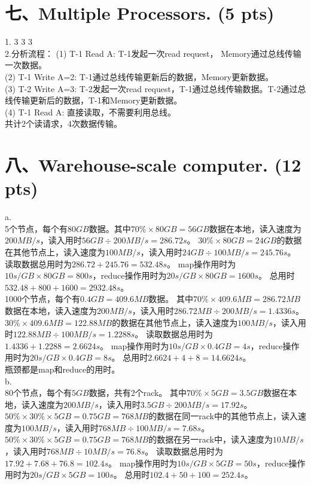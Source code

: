 \documentclass[UTF8]{ctexart}
\begin{document}
\section*{七、Multiple Processors. (5 pts)}
1. 3 3 3\\
2.分析流程：
(1) T-1 Read A: T-1发起一次read request， Memory通过总线传输一次数据。\\
(2) T-1 Write A=2: T-1通过总线传输更新后的数据，Memory更新数据。\\
(3) T-2 Write A=3: T-2发起一次read request，T-1通过总线传输数据。T-2通过总线传输更新后的数据，T-1和Memory更新数据。\\
(4) T-1 Read A: 直接读取，不需要利用总线。\\
共计2个读请求，4次数据传输。\\
\section*{八、Warehouse-scale computer. (12 pts)}
a. \\
5个节点，每个有$80GB$数据。其中$70\%\times80GB=56GB$数据在本地，读入速度为$200MB/s$，读入用时$56GB\div200MB/s=286.72s$。
$30\%\times80GB=24GB$的数据在其他节点上，读入速度为$100MB/s$，读入用时$24GB\div100MB/s=245.76s$。
读取数据总用时为$286.72+245.76=532.48s$。
map操作用时为$10s/GB\times80GB=800s$，reduce操作用时为$20s/GB\times80GB=1600s$。
总用时$532.48+800+1600=2932.48s$。\\

1000个节点，每个有$0.4GB=409.6MB$数据。
其中$70\%\times409.6MB=286.72MB$数据在本地，读入速度为$200MB/s$，读入用时$286.72MB\div200MB/s=1.4336s$。
$30\%\times409.6MB=122.88MB$的数据在其他节点上，读入速度为$100MB/s$，读入用时$122.88MB\div100MB/s=1.2288s$。
读取数据总用时为$1.4336+1.2288=2.6624s$。
map操作用时为$10s/GB\times0.4GB=4s$，reduce操作用时为$20s/GB\times0.4GB=8s$。
总用时$2.6624+4+8=14.6624s$。\\

瓶颈都是map和reduce的用时。\\
b. \\
80个节点，每个有$5GB$数据，共有2个rack。
其中$70\%\times5GB=3.5GB$数据在本地，读入速度为$200MB/s$，读入用时$3.5GB\div200MB/s=17.92s$。
$50\%\times30\%\times5GB=0.75GB=768MB$的数据在同一rack中的其他节点上，读入速度为$100MB/s$，读入用时$768MB\div100MB/s=7.68s$。
$50\%\times30\%\times5GB=0.75GB=768MB$的数据在另一rack中，读入速度为$10MB/s$，读入用时$768MB\div10MB/s=76.8s$。
读取数据总用时为$17.92+7.68+76.8=102.4s$。
map操作用时为$10s/GB\times5GB=50s$，reduce操作用时为$20s/GB\times5GB=100s$。
总用时$102.4+50+100=252.4s$。\\
\end{document}
